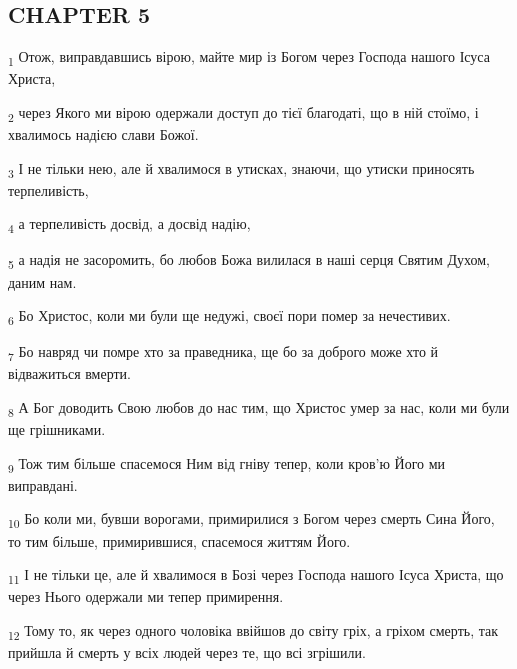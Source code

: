 \subsection{CHAPTER 5}
\begin{tcolorbox}
\textsubscript{1} Отож, виправдавшись вірою, майте мир із Богом через Господа нашого Ісуса Христа,
\end{tcolorbox}
\begin{tcolorbox}
\textsubscript{2} через Якого ми вірою одержали доступ до тієї благодаті, що в ній стоїмо, і хвалимось надією слави Божої.
\end{tcolorbox}
\begin{tcolorbox}
\textsubscript{3} І не тільки нею, але й хвалимося в утисках, знаючи, що утиски приносять терпеливість,
\end{tcolorbox}
\begin{tcolorbox}
\textsubscript{4} а терпеливість досвід, а досвід надію,
\end{tcolorbox}
\begin{tcolorbox}
\textsubscript{5} а надія не засоромить, бо любов Божа вилилася в наші серця Святим Духом, даним нам.
\end{tcolorbox}
\begin{tcolorbox}
\textsubscript{6} Бо Христос, коли ми були ще недужі, своєї пори помер за нечестивих.
\end{tcolorbox}
\begin{tcolorbox}
\textsubscript{7} Бо навряд чи помре хто за праведника, ще бо за доброго може хто й відважиться вмерти.
\end{tcolorbox}
\begin{tcolorbox}
\textsubscript{8} А Бог доводить Свою любов до нас тим, що Христос умер за нас, коли ми були ще грішниками.
\end{tcolorbox}
\begin{tcolorbox}
\textsubscript{9} Тож тим більше спасемося Ним від гніву тепер, коли кров'ю Його ми виправдані.
\end{tcolorbox}
\begin{tcolorbox}
\textsubscript{10} Бо коли ми, бувши ворогами, примирилися з Богом через смерть Сина Його, то тим більше, примирившися, спасемося життям Його.
\end{tcolorbox}
\begin{tcolorbox}
\textsubscript{11} І не тільки це, але й хвалимося в Бозі через Господа нашого Ісуса Христа, що через Нього одержали ми тепер примирення.
\end{tcolorbox}
\begin{tcolorbox}
\textsubscript{12} Тому то, як через одного чоловіка ввійшов до світу гріх, а гріхом смерть, так прийшла й смерть у всіх людей через те, що всі згрішили.
\end{tcolorbox}
